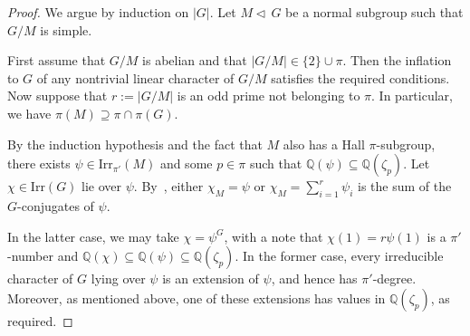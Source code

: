 \documentclass[12pt]{amsart}
\theoremstyle{definition}
\numberwithin{equation}{section}
\newcommand{\Irr}{{\mathrm {Irr}}}
\newcommand{\QQ}{{\mathbb Q}}
\begin{document}
\begin{proof}
We argue by induction on $|G|$. %
Let $M \triangleleft\, G$ be %
a
normal subgroup such that $G/M$ is simple.

First assume %
that $G/M$ is %
abelian and that $|G/M| \in \{2\} \cup
\pi$. Then the inflation to $G$ of any nontrivial linear character
of $G/M$ satisfies the required conditions. Now suppose %
that $r :=
|G/M|$ is %
an odd prime not belonging to $\pi$. In particular, we
have $\pi(M) \supseteq \pi\cap\pi(G)$.

By the induction hypothesis and the fact that $M$ also has a Hall
$\pi$-subgroup, there exists $\psi \in \Irr_{\pi'}(M)$ and %
some $p
\in \pi$ such %
that $\QQ(\psi) \subseteq \QQ(\zeta_p)$. Let $\chi \in
\Irr(G)$ lie over $\psi$. %
By~\cite[Corollary~6.19]{Isaacs1}, either
$\chi_M = \psi$ or $\chi_M = \sum_{i=1}^r \psi_i$ is %
the sum of the
$G$-conjugates of $\psi$.

In the latter case, we may take $\chi = \psi^G$, with a note %
that
$\chi(1) = r \psi(1)$ is %
a $\pi'$-number and %
$\QQ(\chi) \subseteq
\QQ(\psi)\subseteq \QQ(\zeta_p)$. In the former case, every
irreducible character of $G$ lying over $\psi$ is an extension of
$\psi$, and hence has $\pi'$-degree. Moreover, as mentioned above,
one of these extensions has values in $\QQ(\zeta_p)$, as required.


\end{proof}
\end{document}
